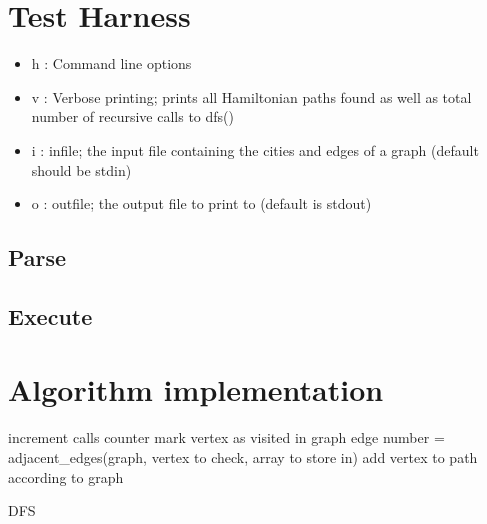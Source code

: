 \documentclass[12pt]{article}
\begin{document}

\section{Test Harness}

\begin{itemize}
	\item{h : Command line options }
	\item{v : Verbose printing; prints all Hamiltonian paths found as well
		as total number of recursive calls to dfs()}
	\item{i : infile; the input file containing the cities and edges of a graph (default should be stdin)}
	\item{o : outfile; the output file to print to (default is stdout)}
\end{itemize}

\subsection{Parse}

\subsection{Execute}

\section{Algorithm implementation}

\begin{algorithm}
	increment calls counter\;
		mark vertex as visited in graph\;
		edge number = adjacent\_edges(graph, vertex to check, array to store in)\;
									add vertex to path according to graph\;
									\caption{DFS}\label{execute}
\end{algorithm}
\end{document}
